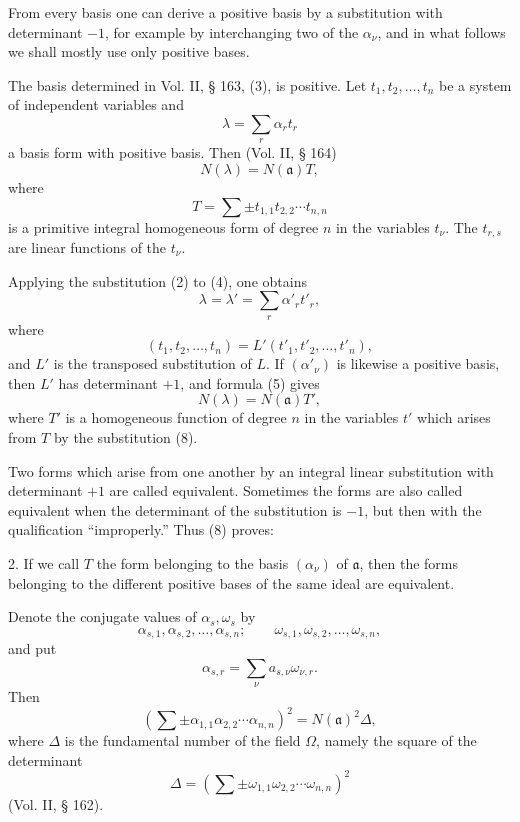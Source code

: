 \documentclass[11pt]{article}
\begin{document}
From every basis one can derive a positive basis by a substitution with determinant $-1$, for example by interchanging two of the $\alpha_\nu$, and in what follows we shall mostly use only positive bases.

The basis determined in Vol. II, § 163, (3), is positive. Let $t_1,t_2,
\ldots,t_n$ be a system of independent variables and
\begin{equation}
 \lambda=\sum_r\alpha_rt_r\tag{4}
\end{equation}
a basis form with positive basis. Then (Vol. II, § 164)
\begin{equation}
 N(\lambda)=N(\mathfrak a)T,\tag{5}
\end{equation}
where
\begin{equation}
 T=\sum\pm t_{1,1}t_{2,2}\cdots t_{n,n}\tag{6}
\end{equation}
is a primitive integral homogeneous form of degree $n$ in the variables $t_\nu$. The $t_{r,s}$ are linear functions of the $t_\nu$.

Applying the substitution (2) to (4), one obtains
\begin{equation}
 \lambda=\lambda'=\sum_r\alpha'_rt'_r,\tag{7}
\end{equation}
where
\begin{equation}
 (t_1,t_2,\ldots,t_n)=L'(t'_1,t'_2,
\ldots,t'_n),\tag{8}
\end{equation}
and $L'$ is the transposed substitution of $L$. If $(\alpha'_\nu)$ is likewise a positive basis, then $L'$ has determinant $+1$, and formula (5) gives
\begin{equation}
 N(\lambda)=N(\mathfrak a)T',\tag{9}
\end{equation}
where $T'$ is a homogeneous function of degree $n$ in the variables $t'$ which arises from $T$ by the substitution (8).

Two forms which arise from one another by an integral linear substitution with determinant $+1$ are called equivalent. Sometimes the forms are also called equivalent when the determinant of the substitution is $-1$, but then with the qualification ``improperly.'' Thus (8) proves:

2. If we call $T$ the form belonging to the basis $(\alpha_\nu)$ of $\mathfrak a$, then the forms belonging to the different positive bases of the same ideal are equivalent.

Denote the conjugate values of $\alpha_s,\omega_s$ by
\[
 \alpha_{s,1},\alpha_{s,2},\ldots,\alpha_{s,n};\qquad
 \omega_{s,1},\omega_{s,2},\ldots,\omega_{s,n},
\]
and put
\begin{equation}
 \alpha_{s,r}=\sum_\nu a_{s,\nu}\omega_{\nu,r}.\tag{10}
\end{equation}
Then
\begin{equation}
 \left(\sum\pm\alpha_{1,1}\alpha_{2,2}\cdots\alpha_{n,n}\right)^2=N(\mathfrak a)^2\Delta,\tag{11}
\end{equation}
where $\Delta$ is the fundamental number of the field $\Omega$, namely the square of the determinant
\[
 \Delta=\left(\sum\pm\omega_{1,1}\omega_{2,2}\cdots\omega_{n,n}\right)^2
\]
(Vol. II, § 162).
\end{document}
